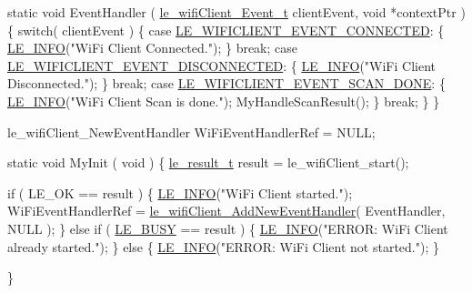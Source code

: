 \begin{DoxyCode}
\textcolor{keyword}{static} \textcolor{keywordtype}{void} EventHandler
(
    \hyperlink{le__wifi_client__interface_8h_a1b776321e539bab3bc6a07078545bca4}{le\_wifiClient\_Event\_t} clientEvent,
    \textcolor{keywordtype}{void} *contextPtr
)
\{
    \textcolor{keywordflow}{switch}( clientEvent )
    \{
         \textcolor{keywordflow}{case} \hyperlink{le__wifi_client__interface_8h_a1b776321e539bab3bc6a07078545bca4a7311dd6562fef67d5c5defbd9dcbc6d2}{LE\_WIFICLIENT\_EVENT\_CONNECTED}:
         \{
             \hyperlink{le__log_8h_a23e6d206faa64f612045d688cdde5808}{LE\_INFO}(\textcolor{stringliteral}{"WiFi Client Connected."});
         \}
         \textcolor{keywordflow}{break};
         \textcolor{keywordflow}{case} \hyperlink{le__wifi_client__interface_8h_a1b776321e539bab3bc6a07078545bca4a72b538a3446d73b0da95db84de318747}{LE\_WIFICLIENT\_EVENT\_DISCONNECTED}:
         \{
             \hyperlink{le__log_8h_a23e6d206faa64f612045d688cdde5808}{LE\_INFO}(\textcolor{stringliteral}{"WiFi Client Disconnected."});
         \}
         \textcolor{keywordflow}{break};
         \textcolor{keywordflow}{case} \hyperlink{le__wifi_client__interface_8h_a1b776321e539bab3bc6a07078545bca4a4202d7b05f16eb80f8b7adfafcef3973}{LE\_WIFICLIENT\_EVENT\_SCAN\_DONE}:
         \{
             \hyperlink{le__log_8h_a23e6d206faa64f612045d688cdde5808}{LE\_INFO}(\textcolor{stringliteral}{"WiFi Client Scan is done."});
             MyHandleScanResult();
         \}
         \textcolor{keywordflow}{break};
    \}
\}

le\_wifiClient\_NewEventHandler WiFiEventHandlerRef = NULL;

\textcolor{keyword}{static} \textcolor{keywordtype}{void} MyInit
(
    \textcolor{keywordtype}{void}
)
\{
    \hyperlink{le__basics_8h_a1cca095ed6ebab24b57a636382a6c86c}{le\_result\_t} result = le\_wifiClient\_start();

    \textcolor{keywordflow}{if} ( LE\_OK == result )
    \{
        \hyperlink{le__log_8h_a23e6d206faa64f612045d688cdde5808}{LE\_INFO}(\textcolor{stringliteral}{"WiFi Client started."});
        WiFiEventHandlerRef = \hyperlink{le__wifi_client__interface_8h_a55aaafbc0a0b4a70faafb50f6babf482}{le\_wifiClient\_AddNewEventHandler}( 
      EventHandler, NULL );
    \}
    \textcolor{keywordflow}{else} \textcolor{keywordflow}{if} ( \hyperlink{le__basics_8h_a1cca095ed6ebab24b57a636382a6c86ca92b0367090993d8b41d1560663d01e8d}{LE\_BUSY} == result )
    \{
        \hyperlink{le__log_8h_a23e6d206faa64f612045d688cdde5808}{LE\_INFO}(\textcolor{stringliteral}{"ERROR: WiFi Client already started."});
    \}
    \textcolor{keywordflow}{else}
    \{
        \hyperlink{le__log_8h_a23e6d206faa64f612045d688cdde5808}{LE\_INFO}(\textcolor{stringliteral}{"ERROR: WiFi Client not started."});
    \}

\}
\end{DoxyCode}
